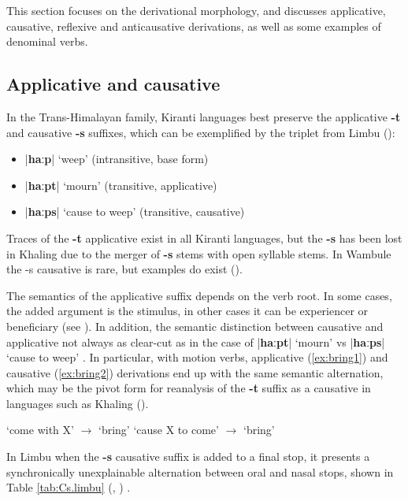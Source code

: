 \documentclass[oneside,a4paper,11pt]{article}
\newcommand{\ipa}[1]{\textbf{{\phon\mbox{#1}}}} %
\newcommand{\dhatu}[2]{|\ipa{#1}| `#2'}
\begin{document}
This section focuses on the derivational morphology, and discusses applicative, causative, reflexive and anticausative derivations,  as well as some examples of denominal verbs.

\subsection{Applicative and causative} \label{sec:appl}
In the Trans-Himalayan family, Kiranti languages best preserve the applicative \ipa{-t} and causative \ipa{-s} suffixes, which can be exemplified by the triplet from Limbu (\citealt{michailovsky85dental}):

\begin{itemize}
\item  \dhatu{haːp}{weep} (intransitive, base form)
\item  \dhatu{haːpt}{mourn} (transitive, applicative)
\item  \dhatu{haːps}{cause to weep} (transitive, causative)
\end{itemize}

Traces of the \ipa{-t} applicative exist in all Kiranti languages, but the \ipa{-s} has been lost in Khaling due to the merger of \ipa{-s} stems with open syllable stems.  In Wambule the -s causative is rare, but examples do exist (\citealt[270-1]{opgenort04wambule}).

The semantics of the applicative suffix depends on the verb root. In some cases, the added argument is the stimulus, in other cases it can be experiencer or beneficiary (see \citealt{jacques15derivational.khaling}). In addition, the semantic distinction between causative and applicative not always as clear-cut as in the case of \dhatu{haːpt}{mourn} vs \dhatu{haːps}{cause to weep} . In particular, with motion verbs, applicative (\ref{ex:bring1}) and causative (\ref{ex:bring2}) derivations end up with the same semantic alternation, which may be the pivot form for reanalysis of the \ipa{-t} suffix as a causative in languages such as Khaling (\citealt{jacques15derivational.khaling}).
\begin{exe}
\ex \label{ex:bring1}
\glt `come with X' $\rightarrow$ `bring'
\ex \label{ex:bring2}
\glt `cause X to come' $\rightarrow$ `bring'
\end{exe}
 
In Limbu when the \ipa{-s} causative suffix is added to a final stop, it presents a synchronically unexplainable alternation between oral and nasal stops, shown in Table \ref{tab:Cs.limbu} (\citealt{driem87}, \citealt[xiii]{michailovsky02dico}) .
\end{document}
